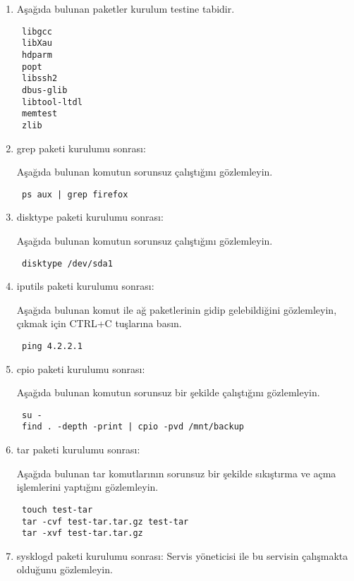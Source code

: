 \documentclass[a4paper,10pt]{article}
\begin{document}
\begin{enumerate}
\item Aşağıda bulunan paketler kurulum testine tabidir.
\begin{verbatim}
 libgcc
 libXau
 hdparm
 popt
 libssh2
 dbus-glib 
 libtool-ltdl 
 memtest 
 zlib
\end{verbatim}

\item grep paketi kurulumu sonrası:

Aşağıda bulunan komutun sorunsuz çalıştığını gözlemleyin.

\begin{verbatim}
 ps aux | grep firefox
\end{verbatim}

\item disktype paketi kurulumu sonrası:

Aşağıda bulunan komutun sorunsuz çalıştığını gözlemleyin.

\begin{verbatim}
 disktype /dev/sda1
\end{verbatim}

\item iputils paketi kurulumu sonrası:

Aşağıda bulunan komut ile ağ paketlerinin gidip gelebildiğini gözlemleyin, çıkmak için CTRL+C tuşlarına basın.
\begin{verbatim}
 ping 4.2.2.1
\end{verbatim}

\item cpio paketi kurulumu sonrası:

Aşağıda bulunan komutun sorunsuz bir şekilde çalıştığını gözlemleyin.
\begin{verbatim}
 su -
 find . -depth -print | cpio -pvd /mnt/backup
\end{verbatim}


\item tar paketi kurulumu sonrası:

Aşağıda bulunan tar komutlarının sorunsuz bir şekilde sıkıştırma ve açma işlemlerini yaptığını gözlemleyin.
\begin{verbatim}
 touch test-tar
 tar -cvf test-tar.tar.gz test-tar 
 tar -xvf test-tar.tar.gz
\end{verbatim}


\item sysklogd paketi kurulumu sonrası:
Servis yöneticisi ile bu servisin çalışmakta olduğunu gözlemleyin.


\end{enumerate}
\end{document}
